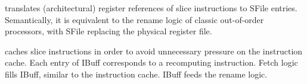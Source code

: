  translates (architectural) register references of slice instructions to SFile entries.
Semantically, it is equivalent to the rename logic of classic out-of-order processors, with SFile replacing the physical register file. 

caches slice instructions in order to avoid
unnecessary pressure on the instruction cache.
Each entry of IBuff corresponds to a recomputing instruction. Fetch logic fills IBuff, similar to the instruction cache. IBuff feeds the rename logic. 


